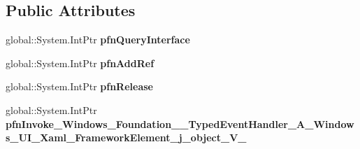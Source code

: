 \subsection*{Public Attributes}
\begin{DoxyCompactItemize}
\item 
\mbox{\label{struct_windows_1_1_foundation_1_1_typed_event_handler___a___windows___u_i___xaml___framework_ele872ac08da67cec047eb0ef56a7d78c65_ae4839c9605f2c81d3727ed7a42a50554}} 
global\+::\+System.\+Int\+Ptr {\bfseries pfn\+Query\+Interface}
\item 
\mbox{\label{struct_windows_1_1_foundation_1_1_typed_event_handler___a___windows___u_i___xaml___framework_ele872ac08da67cec047eb0ef56a7d78c65_a28c06d3ad5d761c3ee565e8c3e05232f}} 
global\+::\+System.\+Int\+Ptr {\bfseries pfn\+Add\+Ref}
\item 
\mbox{\label{struct_windows_1_1_foundation_1_1_typed_event_handler___a___windows___u_i___xaml___framework_ele872ac08da67cec047eb0ef56a7d78c65_a53a9b0de5d7e800c3565242d9659898f}} 
global\+::\+System.\+Int\+Ptr {\bfseries pfn\+Release}
\item 
\mbox{\label{struct_windows_1_1_foundation_1_1_typed_event_handler___a___windows___u_i___xaml___framework_ele872ac08da67cec047eb0ef56a7d78c65_aca11525a5a4f4d728f7470cf7bd9a2cd}} 
global\+::\+System.\+Int\+Ptr {\bfseries pfn\+Invoke\+\_\+\+Windows\+\_\+\+Foundation\+\_\+\+\_\+\+Typed\+Event\+Handler\+\_\+\+A\+\_\+\+Windows\+\_\+\+U\+I\+\_\+\+Xaml\+\_\+\+Framework\+Element\+\_\+j\+\_\+object\+\_\+\+V\+\_\+}
\end{DoxyCompactItemize}
